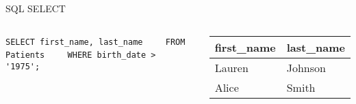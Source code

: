 \documentclass[aspectratio=169]{beamer}
\begin{document}
\begin{frame}[fragile]{SQL SELECT}
\begin{columns}
		\begin{tcolorbox}[colback=LightGreen, colframe=DarkGreen]
			\small
			\verb|SELECT first_name, last_name|
			\verb|    FROM Patients|
			\verb|    WHERE birth_date > '1975';|
		\end{tcolorbox}
		\pause
		
		\begin{tcolorbox}[colback=LightBlue, colframe=DarkBlue]
			{\tiny
				\begin{tabular}{ll}
					\bf first\_name & \bf last\_name \\ \hline
					Lauren & Johnson \\
					Alice & Smith \\
				\end{tabular}
			}
		\end{tcolorbox}
		
		\end{columns}
		
	\end{frame}
\end{document}

